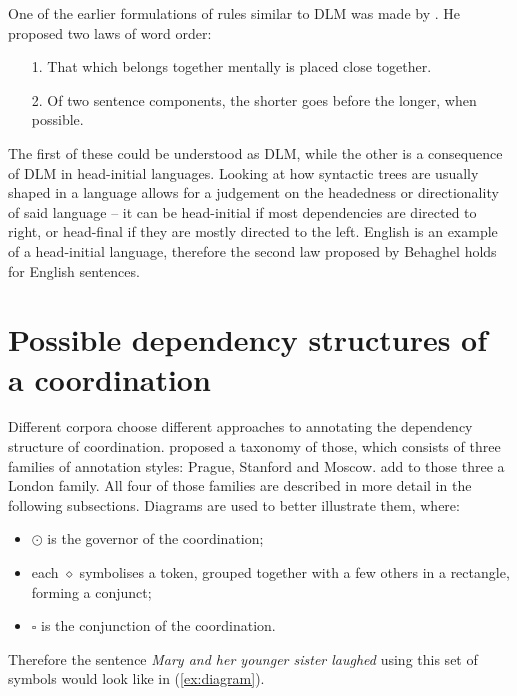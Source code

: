 One of the earlier formulations of rules similar to DLM was made by \cite{behaghel}. He proposed two laws of word order:

\begin{itemize}
    \item[1.] That which belongs together mentally is placed close together.
    \item[2.] Of two sentence components, the shorter goes before the longer, when possible.
\end{itemize}

The first of these could be understood as DLM, while the other is a consequence of DLM in head-initial languages. Looking at how syntactic trees are usually shaped in a language allows for a judgement on the headedness or directionality of said language -- it can be head-initial if most dependencies are directed to right, or head-final if they are mostly directed to the left. English is an example of a head-initial language, therefore the second law proposed by Behaghel holds for English sentences. 

\section{Possible dependency structures of a coordination}\label{sec:coord annotations}

Different corpora choose different approaches to annotating the dependency structure of coordination. \cite{popel2013coordination} proposed a taxonomy of those, which consists of three families of annotation styles: Prague, Stanford and Moscow. \cite{prz:woz:23} add to those three a London family. All four of those families are described in more detail in the following subsections. Diagrams are used to better illustrate them, where:
\begin{itemize}
    \item $\odot$ is the governor of the coordination;
    \item each $\diamond$ symbolises a token, grouped together with a few others in a rectangle, forming a conjunct;
    \item $\square$ is the conjunction of the coordination.
\end{itemize}

Therefore the sentence \textsl{Mary and her younger sister laughed} using this set of symbols would look like in (\ref{ex:diagram}).

